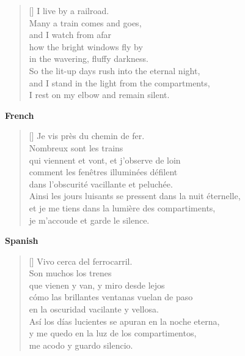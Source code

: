\documentclass[a4paper,12pt,twoside,final]{book}
\begin{document}
\newpage



\settowidth{\versewidth}{and I stand in the light from the compartments,}

\begin{verse}[\versewidth]
  I live by a railroad. \\
  Many a train comes and goes, \\
  and I watch from afar \\
  how the bright windows fly by \\
  in the wavering, fluffy darkness. \\
  So the lit-up days rush into the eternal night, \\
  and I stand in the light from the compartments, \\
  I rest on my elbow and remain silent. \\
\end{verse}

\bigskip

\noindent \textbf{French}


\settowidth{\versewidth}{Ainsi les jours luisants se pressent dans la nuit éternelle,}

\begin{verse}[\versewidth]
  Je vis près du chemin de fer. \\
  Nombreux sont les trains \\
  qui viennent et vont, et j'observe de loin \\
  comment les fenêtres illuminées défilent \\
  dans l'obscurité vacillante et peluchée. \\
  Ainsi les jours luisants se pressent dans la nuit éternelle, \\
  et je me tiens dans la lumière des compartiments, \\
  je m'accoude et garde le silence. \\
\end{verse}

\bigskip

\noindent \textbf{Spanish}


\settowidth{\versewidth}{Así los días lucientes se apuran en la noche eterna,}

\begin{verse}[\versewidth]
  Vivo cerca del ferrocarril. \\
  Son muchos los trenes \\
  que vienen y van, y miro desde lejos \\
  cómo las brillantes ventanas vuelan de paso \\
  en la oscuridad vacilante y vellosa. \\
  Así los días lucientes se apuran en la noche eterna, \\
  y me quedo en la luz de los compartimentos, \\
  me acodo y guardo silencio. \\
\end{verse}
\end{document}
